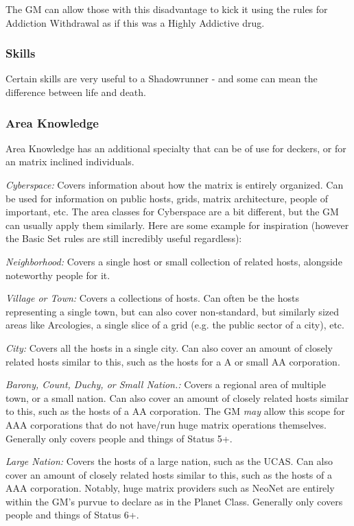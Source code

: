 \begin{multicols}{3}
	The GM can allow those with this disadvantage to kick it using the rules for Addiction Withdrawal as if this was a Highly Addictive drug.
	
	\subsubsection{Skills}
	
	Certain skills are very useful to a Shadowrunner - and some can mean the difference between life and death.
	
	\subsubsection*{Area Knowledge}
	
	Area Knowledge has an additional specialty that can be of use for deckers, or for an matrix inclined individuals.
	
	\textit{Cyberspace:} Covers information about how the matrix is entirely organized. Can be used for information on public hosts, grids, matrix architecture, people of important, etc. The area classes for Cyberspace are a bit different, but the GM can usually apply them similarly. Here are some example for inspiration (however the Basic Set rules are still incredibly useful regardless):
	
	\textit{Neighborhood:} Covers a single host or small collection of related hosts, alongside noteworthy people for it.
	
	\textit{Village or Town:} Covers a collections of hosts. Can often be the hosts representing a single town, but can also cover non-standard, but similarly sized areas like Arcologies, a single slice of a grid (e.g. the public sector of a city), etc. 
	
	\textit{City:} Covers all the hosts in a single city. Can also cover an amount of closely related hosts similar to this, such as the hosts for a A or small AA corporation.
	
	\textit{Barony, Count, Duchy, or Small Nation.:} Covers a regional area of multiple town, or a small nation. Can also cover an amount of closely related hosts similar to this, such as the hosts of a AA corporation. The GM \textit{may} allow this scope for AAA corporations that do not have/run huge matrix operations themselves. Generally only covers people and things of Status 5+.
	
	\textit{Large Nation:} Covers the hosts of a large nation, such as the UCAS. Can also cover an amount of closely related hosts similar to this, such as the hosts of a AAA corporation. Notably, huge matrix providers such as NeoNet are entirely within the GM's purvue to declare as in the Planet Class. Generally only covers people and things of Status 6+.
	

\end{multicols}
